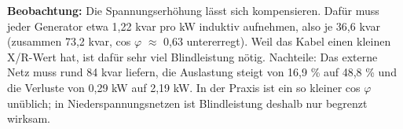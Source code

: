 \documentclass[11pt,a4paper]{article}
\begin{document}
\textbf{Beobachtung:} Die Spannungserhöhung lässt sich kompensieren. Dafür muss jeder Generator etwa 1,22 kvar pro kW induktiv aufnehmen, also je 36,6 kvar (zusammen 73,2 kvar, cos $\varphi$ $\approx$ 0,63 untererregt). Weil das Kabel einen kleinen X/R-Wert hat, ist dafür sehr viel Blindleistung nötig. Nachteile: Das externe Netz muss rund 84 kvar liefern, die Auslastung steigt von 16,9 \% auf 48,8 \% und die Verluste von 0,29 kW auf 2,19 kW. In der Praxis ist ein so kleiner cos $\varphi$ unüblich; in Niederspannungsnetzen ist Blindleistung deshalb nur begrenzt wirksam.
\end{document}
